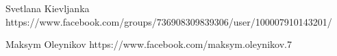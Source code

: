  
 
 
 
 
Svetlana Kievljanka
https://www.facebook.com/groups/736908309839306/user/100007910143201/

Maksym Oleynikov
https://www.facebook.com/maksym.oleynikov.7
